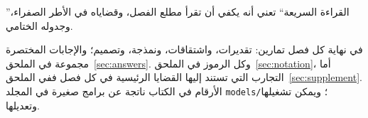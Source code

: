 ”القراءة السريعة“ تعني أنه يكفي أن تقرأ مطلع الفصل، وقضاياه في الأطر الصفراء، وجدوله الختامي.

في نهاية كل فصل تمارين: تقديرات، واشتقاقات، ونمذجة، وتصميم؛ والإجابات المختصرة مجموعة في الملحق~\ref{sec:answers}. وكل الرموز في الملحق~\ref{sec:notation}، أما التجارب التي تستند إليها القضايا الرئيسية في كل فصل ففي الملحق~\ref{sec:supplement}. الأرقام في الكتاب ناتجة عن برامج صغيرة في المجلد \texttt{models/}؛ ويمكن تشغيلها وتعديلها.
